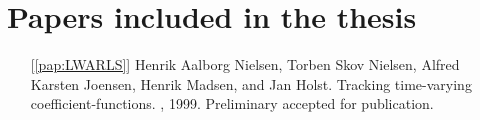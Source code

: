 \chapter{Papers included in the thesis}


\begin{itemize}

\item[{[\ref{pap:LWARLS}]}]
  Henrik Aalborg Nielsen, Torben Skov Nielsen, Alfred Karsten\linebreak
  Joensen, Henrik Madsen, and Jan Holst.  \newblock Tracking
  time-varying coefficient-functions.  , 1999.  \newblock
  Preliminary accepted for publication.


\end{itemize}
